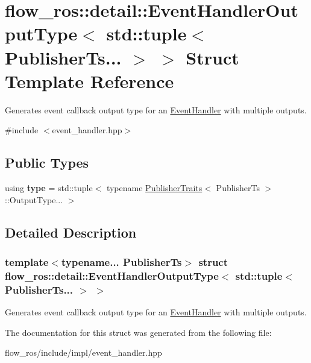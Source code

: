 \hypertarget{structflow__ros_1_1detail_1_1_event_handler_output_type_3_01std_1_1tuple_3_01_publisher_ts_8_8_8_01_4_01_4}{}\section{flow\+\_\+ros\+:\+:detail\+:\+:Event\+Handler\+Output\+Type$<$ std\+:\+:tuple$<$ Publisher\+Ts... $>$ $>$ Struct Template Reference}
\label{structflow__ros_1_1detail_1_1_event_handler_output_type_3_01std_1_1tuple_3_01_publisher_ts_8_8_8_01_4_01_4}


Generates event callback output type for an \hyperlink{classflow__ros_1_1_event_handler}{Event\+Handler} with multiple outputs.  




{\ttfamily \#include $<$event\+\_\+handler.\+hpp$>$}

\subsection*{Public Types}
\begin{DoxyCompactItemize}
\item 
\mbox{\label{structflow__ros_1_1detail_1_1_event_handler_output_type_3_01std_1_1tuple_3_01_publisher_ts_8_8_8_01_4_01_4_a898c9b0937975f04f3401de8f349a2f1}} 
using {\bfseries type} = std\+::tuple$<$ typename \hyperlink{structflow__ros_1_1_publisher_traits}{Publisher\+Traits}$<$ Publisher\+Ts $>$\+::Output\+Type... $>$
\end{DoxyCompactItemize}


\subsection{Detailed Description}
\subsubsection*{template$<$typename... Publisher\+Ts$>$\newline
struct flow\+\_\+ros\+::detail\+::\+Event\+Handler\+Output\+Type$<$ std\+::tuple$<$ Publisher\+Ts... $>$ $>$}

Generates event callback output type for an \hyperlink{classflow__ros_1_1_event_handler}{Event\+Handler} with multiple outputs. 

The documentation for this struct was generated from the following file\+:\begin{DoxyCompactItemize}
\item 
flow\+\_\+ros/include/impl/event\+\_\+handler.\+hpp\end{DoxyCompactItemize}
